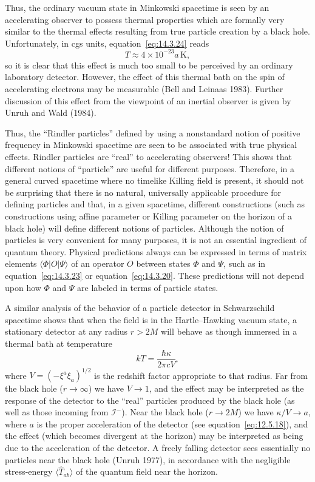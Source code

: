 Thus, the ordinary vacuum state in Minkowski spacetime is seen by an accelerating
observer to possess thermal properties which are formally very similar to the thermal
effects resulting from true particle creation by a black hole. Unfortunately, in cgs
units, equation~\eqref{eq:14.3.24} reads
\begin{equation}
  T\approx4\times10^{-23}a\,\mathrm K,
  \tag{14.3.25}\label{eq:14.3.25}
\end{equation}
so it is clear that this effect is much too small to be perceived by an ordinary
laboratory detector. However, the effect of this thermal bath on the spin of
accelerating electrons may be measurable (Bell and Leinaas 1983). Further
discussion of this effect from the viewpoint of an inertial observer is given by Unruh
and Wald (1984).

Thus, the ``Rindler particles'' defined by using a nonstandard notion of positive
frequency in Minkowski spacetime are seen to be associated with true physical
effects. Rindler particles are ``real'' to accelerating observers! This shows that
different notions of ``particle'' are useful for different purposes. Therefore, in a
general curved spacetime where no timelike Killing field is present, it should not be
surprising that there is no natural, universally applicable procedure for defining
particles and that, in a given spacetime, different constructions (such as constructions
using affine parameter or Killing parameter on the horizon of a black hole) will define
different notions of particles. Although the notion of particles is very convenient for
many purposes, it is not an essential ingredient of quantum theory. Physical
predictions always can be expressed in terms of matrix elements
\(\langle\Phi\rvert O\lvert\Psi\rangle\) of an operator \(O\) between states
\(\Phi\) and \(\Psi\), such as in equation~\eqref{eq:14.3.23} or
equation~\eqref{eq:14.3.20}. These predictions will not depend upon how \(\Phi\)
and \(\Psi\) are labeled in terms of particle states.

A similar analysis of the behavior of a particle detector in Schwarzschild spacetime
shows that when the field is in the Hartle--Hawking vacuum state, a stationary
detector at any radius \(r>2M\) will behave as though immersed in a thermal bath at
temperature
\begin{equation}
  kT=\frac{\hbar\kappa}{2\pi cV},
  \tag{14.3.26}\label{eq:14.3.26}
\end{equation}
where \(V=(-\xi^a\xi_a)^{1/2}\) is the redshift factor appropriate to that radius.
Far from the black hole (\(r\longrightarrow\infty\)) we have
\(V\longrightarrow1\), and the effect may be interpreted as the response of the
detector to the ``real'' particles produced by the black hole (as well as those
incoming from \(\mathcal I^-\)). Near the black hole
(\(r\longrightarrow2M\)) we have \(\kappa/V\longrightarrow a\), where \(a\) is
the proper acceleration of the detector (see equation~\eqref{eq:12.5.18}), and the
effect (which becomes divergent at the horizon) may be interpreted as being due to
the acceleration of the detector. A freely falling detector sees essentially no
particles near the black hole (Unruh 1977), in accordance with the negligible
stress-energy \(\langle\widehat T_{ab}\rangle\) of the quantum field near the
horizon.
